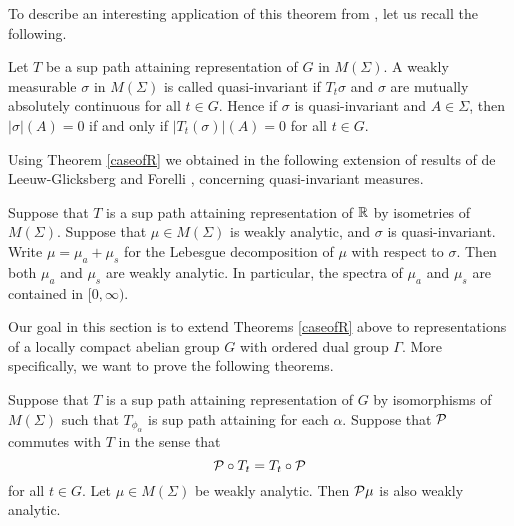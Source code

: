 \documentclass[12pt,leqno]{article}
\def\R{\Bbb R}
\def\cP{{\cal P}}
\begin{document}
To describe an interesting application
of this theorem from \cite{amss}, let us recall the following.



\begin{defin}
Let $T$ be a sup path attaining 
representation of $G$ in $M(\Sigma)$.
A weakly measurable $\sigma$ in $M(\Sigma)$ is
called quasi-invariant if 
$T_t\sigma$ and $\sigma$
are mutually absolutely continuous for all $t\in G$.  Hence
if $\sigma$ is quasi-invariant
and $A\in \Sigma$, then 
$|\sigma|(A)=0$ if and only if $|T_t(\sigma)|(A)=0$
for all $t\in G$.
\label{qi}
\end{defin}


Using Theorem \ref{caseofR} we obtained in \cite{amss} the following extension of results of 
de Leeuw-Glicksberg \cite{deleeuwglicksberg} and 
Forelli \cite{forelli}, concerning quasi-invariant measures.  




\begin{thm}
Suppose that $T$ is a sup path attaining representation
of $\R$ by isometries of $M(\Sigma)$.  Suppose 
that $\mu\in M(\Sigma)$ is weakly analytic, and
$\sigma$ is quasi-invariant.  Write
$\mu=\mu_a+\mu_s$ for the Lebesgue decomposition of $\mu$
with respect to $\sigma$.  Then both
$\mu_a$ and $\mu_s$ are weakly analytic.  In particular,
the spectra of $\mu_a$ and $\mu_s$ are
contained in $[0,\infty)$.
\label{lebesgue-decomp-forR}
\end{thm}


Our goal in this section is to extend Theorems \ref{caseofR}
above to representations of a locally compact abelian group $G$ with ordered dual group $\Gamma$.
More specifically, we want to prove the following theorems.




\begin{thm}
\label{application1}
Suppose that $T$ is a sup path attaining 
representation of $G$ by isomorphisms of $M(\Sigma)$ such that 
$T_{\phi_\alpha}$ is sup path attaining for each $\alpha$.
Suppose that $\cP$ commutes with $T$ in the sense
that 
$$\cP\circ T_t=T_t\circ \cP$$
for all $t\in G$.  
Let $\mu\in M(\Sigma)$ be weakly analytic.
Then $\cP \mu$ is also weakly analytic.
\end{thm}
\end{document}
